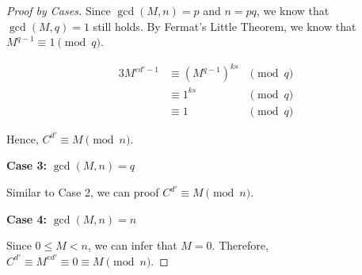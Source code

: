 \documentclass[a4paper,12pt]{article}
\begin{document}
\begin{proof}[Proof by Cases]
Since $\gcd(M,n) = p$ and $n = pq$, we know that $\gcd(M,q) = 1$ still holds.
By Fermat's Little Theorem, we know that $M^{q-1} \equiv 1 \pmod{q}$.

\begin{alignat*}{3}
	M^{ed' - 1} &\equiv (M^{q-1})^{k s} &\pmod{q} \\
	&\equiv 1^{k s} &\pmod{q} \\
	&\equiv 1 &\pmod{q}
\end{alignat*}

Hence, $C^{d'} \equiv M \pmod{n}$.

\textbf{Case 3:} $\gcd(M,n) = q$

Similar to Case 2, we can proof $C^{d'} \equiv M \pmod{n}$.

\textbf{Case 4:} $\gcd(M,n) = n$

Since $0 \leq M < n$, we can infer that $M = 0$.
Therefore, $C^{d'} \equiv M^{ed'} \equiv 0 \equiv M \pmod{n}$.
\end{proof}
\end{document}
